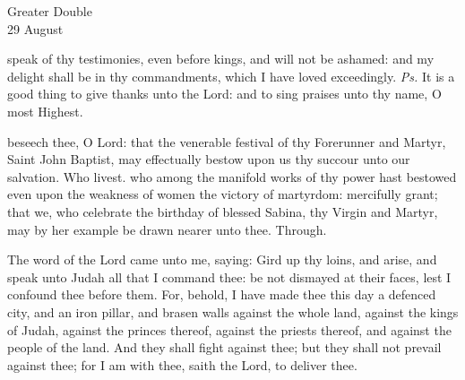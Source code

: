 \begin{inhead}
    {Greater Double\\
29 August}
\end{inhead}
\par\noindent
{}\par\noindent
{}

\introit
{} speak of thy testimonies, even before kings, and will not be ashamed: and my delight shall be in thy commandments, which I have loved exceedingly. \textit{Ps.} It is a good thing to give thanks unto the Lord: and to sing praises unto thy name, O most Highest.

\collect
{} beseech thee, O Lord: that the venerable festival of thy Forerunner and Martyr, Saint John Baptist, may effectually bestow upon us thy succour unto our salvation. Who livest.
 who among the manifold works of thy power hast bestowed even upon the weakness of women the victory of martyrdom: mercifully grant; that we, who celebrate the birthday of blessed Sabina, thy Virgin and Martyr, may by her example be drawn nearer unto thee. Through.

 The word of the Lord came unto me, saying: Gird up thy loins, and arise, and speak unto Judah all that I command thee: be not dismayed at their faces, lest I confound thee before them. For, behold, I have made thee this day a defenced city, and an iron pillar, and brasen walls against the whole land, against the kings of Judah, against the princes thereof, against the priests thereof, and against the people of the land. And they shall fight against thee; but they shall not prevail against thee; for I am with thee, saith the Lord, to deliver thee.


